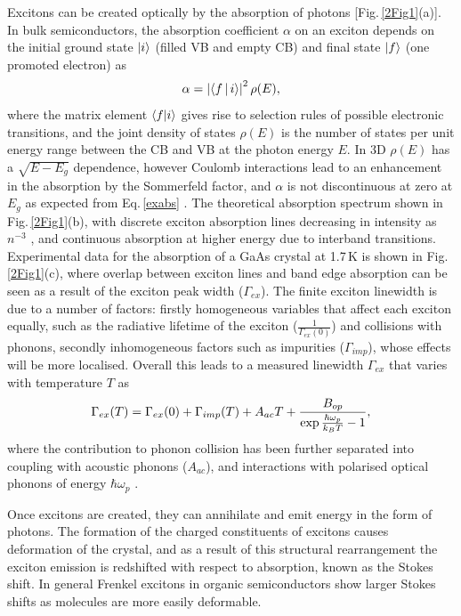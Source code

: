Excitons can be created optically by the absorption of photons [Fig.\,\ref{2Fig1}(a)]. In bulk semiconductors, the absorption coefficient $\alpha$ on an exciton depends on the initial ground state $\ket{i}$ (filled VB and empty CB) and final state $\ket{f}$ (one promoted electron) as
\begin{equation}
\centering
\alpha = \left| \Braket{f | i} \right|^2 \rho(E) ,
\label{exabs}
\end{equation}
where the matrix element $\braket{f | i}$ gives rise to selection rules of possible electronic transitions, and the joint density of states $\rho(E)$ is the number of states per unit energy range between the CB and VB at the photon energy $E$. In 3D $\rho(E)$ has a $\sqrt{E-E_g}$ dependence, however Coulomb interactions lead to an enhancement in the absorption by the Sommerfeld factor, and $\alpha$ is not discontinuous at zero at $E_g$ as expected from Eq.\,\ref{exabs} \cite{Bassu1997}. The theoretical absorption spectrum shown in Fig.\,\ref{2Fig1}(b), with discrete exciton absorption lines decreasing in intensity as $n^{-3}$ \cite{Bassu1997}, and continuous absorption at higher energy due to interband transitions. Experimental data for the absorption of a GaAs crystal at 1.7\,K is shown in Fig.\,\ref{2Fig1}(c), where overlap between exciton lines and band edge absorption can be seen as a result of the exciton peak width ($\Gamma_{ex}$). The finite exciton linewidth is due to a number of factors: firstly homogeneous variables that affect each exciton equally, such as the radiative lifetime of the exciton ($\frac{1}{\Gamma_{ex}(0)}$) and collisions with phonons, secondly inhomogeneous factors such as impurities ($\Gamma_{imp}$), whose effects will be more localised. Overall this leads to a measured linewidth $\Gamma_{ex}$ that varies with temperature $T$ as
\begin{equation}
\centering
\Gamma_{ex}(T) = \Gamma_{ex}(0) +  \Gamma_{imp}(T) +A_{ac}T + \frac{B_{op}}{\exp{\frac{\hbar\omega_p}{k_B T}}-1},
\label{exwidth}
\end{equation}
where the contribution to phonon collision has been further separated into coupling with acoustic phonons ($A_{ac}$), and interactions with polarised optical phonons of energy $\hbar\omega_p$ \cite{Dammak2009}. 

Once excitons are created, they can annihilate and emit energy in the form of photons. The formation of the charged constituents of excitons causes deformation of the crystal, and as a result of this structural rearrangement the exciton emission is redshifted with respect to absorption, known as the Stokes shift. In general Frenkel excitons in organic semiconductors show larger Stokes shifts as molecules are more easily deformable.

